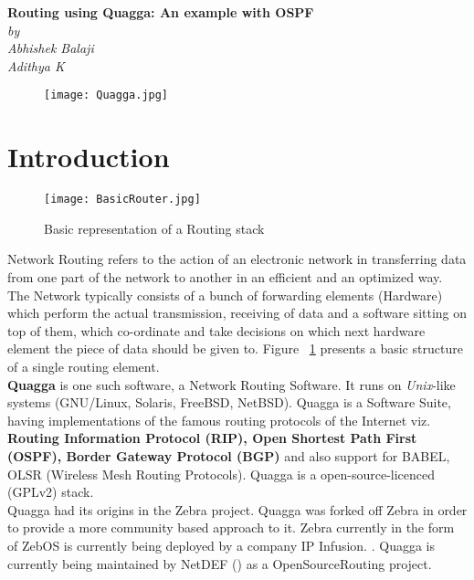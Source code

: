\documentclass{article}
\begin{document}
\begin{titlepage}
\begin{center}
    \Large\textbf{Routing using Quagga: An example with OSPF}\\
    \textit{by}\\
    \large\textit{Abhishek Balaji \\ Adithya K}
\end{center}
\vspace{2cm}
\begin{figure}[ht!]
  \centering
  \texttt{[image: Quagga.jpg]}
\end{figure}

\end{titlepage}
\tableofcontents
\clearpage
\section{Introduction}
\begin{figure}[ht!]
  \centering
  \texttt{[image: BasicRouter.jpg]}
  \caption{Basic representation of a Routing stack}
  \label{fig:basicrouter}
\end{figure}
Network Routing refers to the action of an electronic network in transferring data 
from one part of the network to another in an efficient and an optimized way. 
The Network typically consists of a bunch of forwarding elements (Hardware) which 
perform the actual transmission, receiving of data and a software sitting on top of them, 
which co-ordinate and take decisions on which next hardware element the piece of data 
should be given to. Figure~ \ref{fig:basicrouter} presents a basic structure 
of a single routing element.\\
\textbf{Quagga} is one such software, a Network Routing Software. It runs on \textit{Unix}-like systems 
(GNU/Linux, Solaris, FreeBSD, NetBSD). Quagga is a Software Suite, having implementations 
of the famous routing protocols of the Internet viz. \textbf{Routing Information Protocol (RIP), 
Open Shortest Path First (OSPF), Border Gateway Protocol (BGP)} and also support for 
BABEL, OLSR (Wireless Mesh Routing Protocols). Quagga is a open-source-licenced (GPLv2) stack.\\
Quagga had its origins in the Zebra project. Quagga was forked off Zebra in order to provide a
more community based approach to it. Zebra currently in the form of ZebOS is currently being
deployed by a company IP Infusion. \cite{zebraipinfusion}. Quagga is currently being maintained
by NetDEF (\cite{netdef}) as a OpenSourceRouting project.
\end{document}
